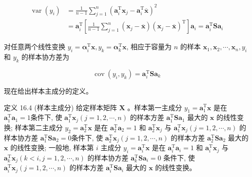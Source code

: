 \documentclass[10pt]{article}
\begin{document}
\begin{align*}
\operatorname{var}\left(y_{i}\right) & =\frac{1}{n-1} \sum_{j=1}^{n}\left(\boldsymbol{a}_{i}^{\mathrm{T}} \boldsymbol{x}_{j}-\boldsymbol{a}_{i}^{\mathrm{T}} \overline{\boldsymbol{x}}\right)^{2} \\
& =\boldsymbol{a}_{i}^{\mathrm{T}}\left[\frac{1}{n-1} \sum_{j=1}^{n}\left(\boldsymbol{x}_{j}-\overline{\boldsymbol{x}}\right)\left(\boldsymbol{x}_{j}-\overline{\boldsymbol{x}}\right)^{\mathrm{T}}\right] \boldsymbol{a}_{i}=\boldsymbol{a}_{i}^{\mathrm{T}} \boldsymbol{S} \boldsymbol{a}_{i} \tag{16.46}
\end{align*}


对任意两个线性变换 $y_{i}=\boldsymbol{\alpha}_{i}^{\mathrm{T}} \boldsymbol{x}, y_{k}=\boldsymbol{\alpha}_{k}^{\mathrm{T}} \boldsymbol{x}$, 相应于容量为 $n$ 的样本 $\boldsymbol{x}_{1}, \boldsymbol{x}_{2}, \cdots, \boldsymbol{x}_{n}, y_{i}$和 $y_{k}$ 的样本协方差为


\begin{equation*}
\operatorname{cov}\left(y_{i}, y_{k}\right)=\boldsymbol{a}_{i}^{\mathrm{T}} \boldsymbol{S} \boldsymbol{a}_{k} \tag{16.47}
\end{equation*}


现在给出样本主成分的定义。

定义 16.4 (样本主成分) 给定样本矩阵 $\boldsymbol{X}$ 。样本第一主成分 $y_{1}=\boldsymbol{a}_{1}^{\mathrm{T}} \boldsymbol{x}$ 是在 $\boldsymbol{a}_{1}^{\mathrm{T}} \boldsymbol{a}_{1}=1$条件下, 使 $\boldsymbol{a}_{1}^{\mathrm{T}} \boldsymbol{x}_{j}(j=1,2, \cdots, n)$ 的样本方差 $\boldsymbol{a}_{1}^{\mathrm{T}} \boldsymbol{S} \boldsymbol{a}_{1}$ 最大的 $\boldsymbol{x}$ 的线性变换; 样本第二主成分 $y_{2}=\boldsymbol{a}_{2}^{\mathrm{T}} \boldsymbol{x}$ 是在 $\boldsymbol{a}_{2}^{\mathrm{T}} \boldsymbol{a}_{2}=1$ 和 $\boldsymbol{a}_{2}^{\mathrm{T}} \boldsymbol{x}_{j}$ 与 $\boldsymbol{a}_{1}^{\mathrm{T}} \boldsymbol{x}_{j}(j=1,2, \cdots, n)$ 的样本协方差 $\boldsymbol{a}_{1}^{\mathrm{T}} \boldsymbol{S} \boldsymbol{a}_{2}=0$条件下, 使 $\boldsymbol{a}_{2}^{\mathrm{T}} \boldsymbol{x}_{j}(j=1,2, \cdots, n)$ 的样本方差 $\boldsymbol{a}_{2}^{\mathrm{T}} \boldsymbol{S} \boldsymbol{a}_{2}$ 最大的 $\boldsymbol{x}$ 的线性变换; 一般地, 样本第 $i$ 主成分 $y_{i}=\boldsymbol{a}_{i}^{\mathrm{T}} \boldsymbol{x}$ 是在 $\boldsymbol{a}_{i}^{\mathrm{T}} \boldsymbol{a}_{i}=1$ 和 $\boldsymbol{a}_{i}^{\mathrm{T}} \boldsymbol{x}_{j}$ 与 $\boldsymbol{a}_{k}^{\mathrm{T}} \boldsymbol{x}_{j}(k<i, j=1,2, \cdots, n)$ 的样本协方差 $\boldsymbol{a}_{k}^{\mathrm{T}} \boldsymbol{S} \boldsymbol{a}_{i}=0$ 条件下, 使 $\boldsymbol{a}_{i}^{\mathrm{T}} \boldsymbol{x}_{j}(j=1,2, \cdots, n)$ 的样本方差 $\boldsymbol{a}_{i}^{\mathrm{T}} \boldsymbol{S} \boldsymbol{a}_{i}$ 最大的 $\boldsymbol{x}$ 的线性变换。
\end{document}
